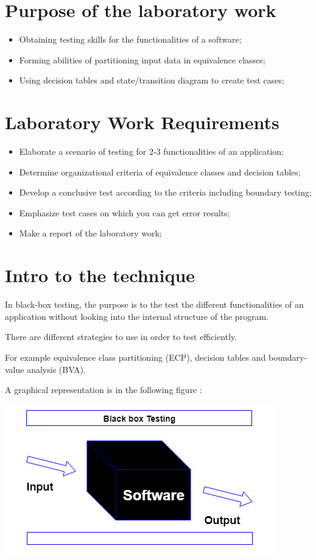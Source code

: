 \section{Purpose of the laboratory work}

\begin{itemize}
	\item Obtaining testing skills for the functionalities of a software; 
	
	\item Forming abilities of partitioning input data in equivalence classes;
	
	\item Using decision tables and state/transition diagram to create test cases;
\end{itemize}

\section{Laboratory Work Requirements}
\begin{itemize}
	\item Elaborate a scenario of testing for 2-3 functionalities of an application;
	
	\item Determine organizational criteria of equivalence classes and decision tables;
	
	\item Develop a conclusive test according to the criteria including boundary testing;
	
	\item Emphasize test cases on which you can get error results;
	
	\item Make a report of the laboratory work;
\end{itemize}

\section{Intro to the technique}

In black-box testing, the purpose is to the test the different functionalities of an application without looking into the internal structure of the program. 

There are different strategies to use in order to test efficiently. 

For example equivalence class partitioning (ECP), decision tables and boundary-value analysis (BVA).

A graphical representation is in the following figure : 

\begin{center}
	\includegraphics[scale=1]{images/Capture1}
\end{center}

\clearpage